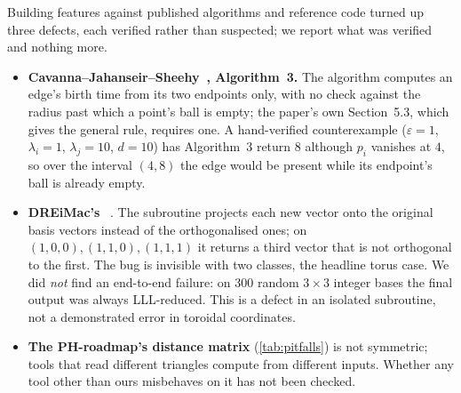 Building features against published algorithms and reference code turned up three defects, each verified rather than
suspected; we report what was verified and nothing more.
\begin{itemize}[leftmargin=1.5em, itemsep=2pt]
\item \textbf{Cavanna--Jahanseir--Sheehy~\cite{cavanna2015sparse}, Algorithm~3.} The algorithm computes an edge's birth time from its
  two endpoints only, with no check against the radius past which a point's ball is empty; the paper's own Section~5.3,
  which gives the general rule, requires one. A hand-verified counterexample ($\varepsilon=1$, $\lambda_i=1$, $\lambda_j=10$,
  $d=10$) has Algorithm~3 return $8$ although $p_i$ vanishes at $4$, so over the interval $(4,8)$ the edge would be present
  while its endpoint's ball is already empty.
\item \textbf{DREiMac's }~\cite{scoccola2022toroidal}. The subroutine projects each new vector onto the original
  basis vectors instead of the orthogonalised ones; on $(1,0,0),(1,1,0),(1,1,1)$ it returns a third vector that is not orthogonal
  to the first. The bug is invisible with two classes, the headline torus case. We did \emph{not} find an end-to-end failure: on
  300 random $3\times3$ integer bases the final output was always LLL-reduced. This is a defect in an isolated subroutine, not a
  demonstrated error in toroidal coordinates.
\item \textbf{The PH-roadmap's  distance matrix} (\cref{tab:pitfalls}) is not symmetric; tools that read different
  triangles compute from different inputs. Whether any tool other than ours misbehaves on it has not been checked.
\end{itemize}
